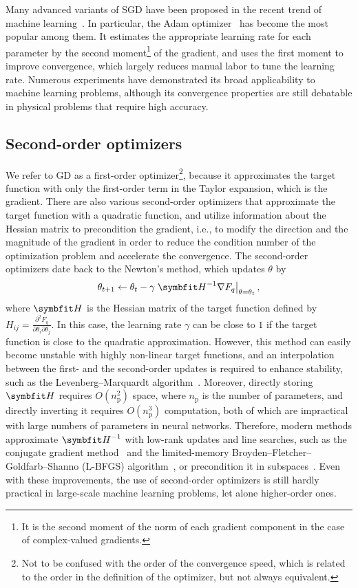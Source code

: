 Many advanced variants of SGD have been proposed in the recent trend of machine learning~\cite{kashyap2022survey}. In particular, the Adam optimizer~\cite{kingma2015adam} has become the most popular among them. It estimates the appropriate learning rate for each parameter by the second moment\footnote{It is the second moment of the norm of each gradient component in the case of complex-valued gradients.} of the gradient, and uses the first moment to improve convergence, which largely reduces manual labor to tune the learning rate. Numerous experiments have demonstrated its broad applicability to machine learning problems, although its convergence properties are still debatable in physical problems that require high accuracy.

\subsection{Second-order optimizers}
\label{sec:ngd}

We refer to GD as a first-order optimizer\footnote{Not to be confused with the order of the convergence speed, which is related to the order in the definition of the optimizer, but not always equivalent.}, because it approximates the target function with only the first-order term in the Taylor expansion, which is the gradient. There are also various second-order optimizers that approximate the target function with a quadratic function, and utilize information about the Hessian matrix to precondition the gradient, i.e., to modify the direction and the magnitude of the gradient in order to reduce the condition number of the optimization problem and accelerate the convergence. The second-order optimizers date back to the Newton's method, which updates $\theta$ by
\begin{equation}
\theta_{t + 1} \gets \theta_t - \gamma \left. \mH^{-1} \nabla F_q \right|_{\theta = \theta_t},
\label{eq:newton}
\end{equation}
where $\mH$ is the Hessian matrix of the target function defined by $H_{i j} = \frac{\partial^2 F_q}{\partial \theta_i \partial \theta_j}$. In this case, the learning rate $\gamma$ can be close to $1$ if the target function is close to the quadratic approximation. However, this method can easily become unstable with highly non-linear target functions, and an interpolation between the first- and the second-order updates is required to enhance stability, such as the Levenberg--Marquardt algorithm~\cite{levenberg1944method}. Moreover, directly storing $\mH$ requires $O(n_\text{p}^2)$ space, where $n_\text{p}$ is the number of parameters, and directly inverting it requires $O(n_\text{p}^3)$ computation, both of which are impractical with large numbers of parameters in neural networks. Therefore, modern methods approximate $\mH^{-1}$ with low-rank updates and line searches, such as the conjugate gradient method~\cite{fletcher1964function} and the limited-memory Broyden--Fletcher--Goldfarb--Shanno (L-BFGS) algorithm~\cite{liu1989limited}, or precondition it in subspaces~\cite{gupta2018shampoo}. Even with these improvements, the use of second-order optimizers is still hardly practical in large-scale machine learning problems, let alone higher-order ones.

